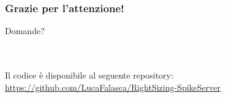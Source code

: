 \documentclass[compress]{beamer}
\begin{document}
\begin{frame}[plain]
	\titlepage
\end{frame}








\begin{frame}
	\frametitle{Grazie per l'attenzione!}
	\begin{Huge}
		Domande?
	\end{Huge} 
	\\ \\
	Il codice è disponibile al seguente repository: \url{https://github.com/LucaFalasca/RightSizing-SpikeServer}
	\\ \\
	
\end{frame}
\end{document}
